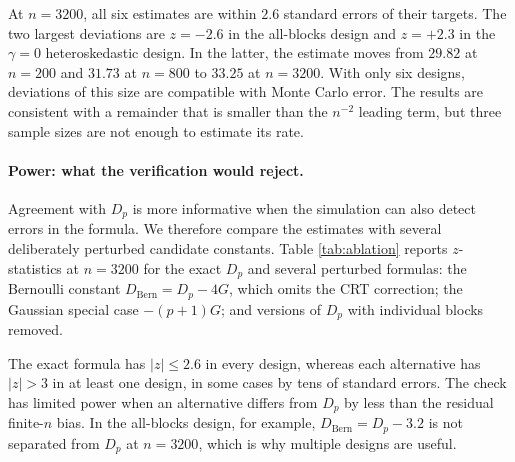 \documentclass{article}
\newcommand{\EEE}{\mathbb{E}}
\newcommand{\Bern}{\mathrm{Bern}}
\theoremstyle{plain}
\theoremstyle{definition}
\theoremstyle{remark}
\begin{document}
At $n=3200$, all six estimates are within $2.6$ standard errors of their
targets. The two largest deviations are $z=-2.6$ in the all-blocks
design and $z=+2.3$ in the $\gamma=0$ heteroskedastic design. In the
latter, the estimate moves from $29.82$ at $n=200$ and $31.73$ at $n=800$
to $33.25$ at $n=3200$. With only six designs, deviations of this size
are compatible with Monte Carlo error. The results are consistent with
a remainder that is smaller than the $n^{-2}$ leading term, but three
sample sizes are not enough to estimate its rate.

\begin{table}[htbp]
\centering
\caption{Simulation comparison with Theorem \ref{theo:deficiency}. Targets are exact; estimates are the control-variate estimator with Monte Carlo standard errors in parentheses. $B=400{,}000$ for $n\in\{200,800\}$ and $B=120{,}000$ for $n=3200$. Parentheses after a design name list the blocks of $D_p$ that are active, in the notation of Theorem \ref{theo:bern_deficiency} and Lemma \ref{lemm:matrix} ($F=\gamma^\top K\gamma$, $Q=(\gamma^\top S)^2$, $\mathcal R=\|S_\gamma\|_F^2$, $E=\mathcal E$, $E_W=\mathcal E_W$); the mixed design has heterogeneity along its skewed coordinate and heteroskedastic residuals, so the covariate-shape blocks and $8S^\top\EEE[Z\varepsilon^2]$ are active.}
\label{tab:validation}
\small
{}
\end{table}

\paragraph{Power: what the verification would reject.}
Agreement with $D_p$ is more informative when the simulation can also
detect errors in the formula. We therefore compare the estimates with
several deliberately perturbed candidate constants. Table \ref{tab:ablation} reports
$z$-statistics at $n=3200$ for the exact $D_p$ and several perturbed
formulas: the Bernoulli constant $D_\Bern=D_p-4G$, which omits the CRT
correction; the Gaussian special case $-(p+1)G$; and versions of $D_p$
with individual blocks removed.

The exact formula has $|z|\leq2.6$ in every design, whereas each
alternative has $|z|>3$ in at least one design, in some cases by tens of standard errors. The check has limited power when an alternative differs from $D_p$ by less than the residual finite-$n$ bias. In the all-blocks design, for example, $D_\Bern=D_p-3.2$ is not separated from $D_p$ at $n=3200$, which is why multiple designs are useful.
\end{document}
